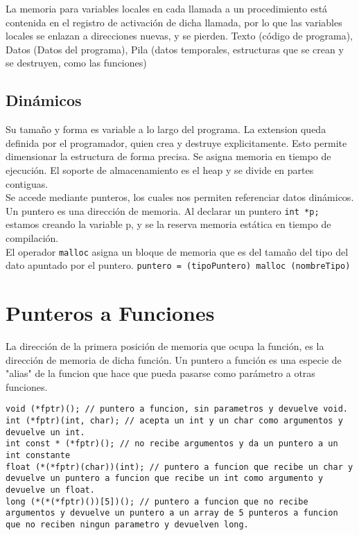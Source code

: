 \documentclass[11pt,a4paper]{article}
\begin{document}
La memoria para variables locales en cada llamada a un procedimiento est\'a contenida en el registro de activaci\'on de dicha llamada, por lo que las variables locales se enlazan a direcciones nuevas, y se pierden. Texto (c\'odigo de programa), Datos (Datos del programa), Pila (datos temporales, estructuras que se crean y se destruyen, como las funciones)

\subsection{Din\'amicos}
Su tamaño y forma es variable a lo largo del programa. La extension queda definida por el programador, quien crea y destruye explicitamente. Esto permite dimensionar la estructura de forma precisa. Se asigna memoria en tiempo de ejecuci\'on. El soporte de almacenamiento es el heap y se divide en partes contiguas.\\

Se accede mediante punteros, los cuales nos permiten referenciar datos din\'amicos. Un puntero es una direcci\'on de memoria. Al declarar un puntero \lstinline!int *p;! estamos creando la variable p, y se la reserva memoria est\'atica en tiempo de compilaci\'on.\\

El operador \lstinline!malloc! asigna un bloque de memoria que es del tamaño del tipo del dato apuntado por el puntero. \lstinline!puntero = (tipoPuntero) malloc (nombreTipo)!

\newpage
\section{Punteros a Funciones}
La dirección de la primera posición de memoria que ocupa la función, es la dirección de memoria de dicha función. Un puntero a funci\'on es una especie de "alias" de la funcion que hace que pueda pasarse como par\'ametro a otras funciones.
\begin{lstlisting}
void (*fptr)(); // puntero a funcion, sin parametros y devuelve void.
int (*fptr)(int, char); // acepta un int y un char como argumentos y devuelve un int.
int const * (*fptr)(); // no recibe argumentos y da un puntero a un int constante
float (*(*fptr)(char))(int); // puntero a funcion que recibe un char y devuelve un puntero a funcion que recibe un int como argumento y devuelve un float.
long (*(*(*fptr)())[5])(); // puntero a funcion que no recibe argumentos y devuelve un puntero a un array de 5 punteros a funcion que no reciben ningun parametro y devuelven long.
\end{lstlisting}
\end{document}
